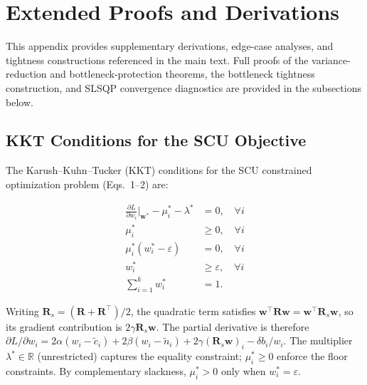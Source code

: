 \documentclass[pdflatex,sn-mathphys-num]{sn-jnl}
\begin{document}
\appendix
\makeatletter
\renewcommand{\thetable}{\@Alph\c@section.\arabic{table}}
\renewcommand{\thefigure}{\@Alph\c@section.\arabic{figure}}
\renewcommand{\thealgorithm}{\@Alph\c@section.\arabic{algorithm}}
\renewcommand{\theequation}{\@Alph\c@section.\arabic{equation}}
\makeatother

\section{Extended Proofs and Derivations}
\label{app:proofs}

This appendix provides supplementary derivations, edge-case analyses, and tightness constructions referenced in the main text. Full proofs of the variance-reduction and bottleneck-protection theorems, the bottleneck tightness construction, and SLSQP convergence diagnostics are provided in the subsections below.

\subsection{KKT Conditions for the SCU Objective}
\label{app:kkt}

The Karush--Kuhn--Tucker (KKT) conditions for the SCU constrained optimization problem (Eqs.~1--2) are:

\begin{align}
\frac{\partial L}{\partial w_i}\bigg|_{\mathbf{w}^*} - \mu_i^* - \lambda^* &= 0, \quad \forall i \\
\mu_i^* &\ge 0, \quad \forall i \\
\mu_i^*(w_i^* - \varepsilon) &= 0, \quad \forall i \\
w_i^* &\ge \varepsilon, \quad \forall i \\
\sum_{i=1}^k w_i^* &= 1.
\end{align}

Writing $\mathbf{R}_{s}=(\mathbf{R}+\mathbf{R}^{\top})/2$, the quadratic term satisfies $\mathbf{w}^{\top}\mathbf{R}\mathbf{w}=\mathbf{w}^{\top}\mathbf{R}_{s}\mathbf{w}$, so its gradient contribution is $2\gamma\mathbf{R}_{s}\mathbf{w}$. The partial derivative is therefore $\partial L / \partial w_i = 2\alpha(w_i - \tilde{c}_i) + 2\beta(w_i - \tilde{n}_i) + 2\gamma(\mathbf{R}_{s}\mathbf{w})_i - \delta b_i / w_i$. The multiplier $\lambda^* \in \mathbb{R}$ (unrestricted) captures the equality constraint; $\mu_i^* \ge 0$ enforce the floor constraints. By complementary slackness, $\mu_i^* > 0$ only when $w_i^* = \varepsilon$.
\end{document}
